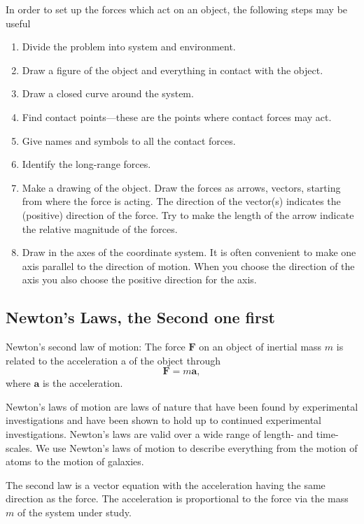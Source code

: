 \documentclass[%
oneside,                 %
final,                   %
10pt]{article}
\begin{document}
In order to set up the forces which act on an object, the following steps may be useful
\begin{enumerate}
\item Divide the problem into system and environment.

\item Draw a figure of the object and everything in contact with the object.

\item Draw a closed curve around the system.

\item Find contact points—these are the points where contact forces may act.

\item Give names and symbols to all the contact forces.

\item Identify the long-range forces.

\item Make a drawing of the object. Draw the forces as arrows, vectors, starting from where the force is acting. The direction of the vector(s) indicates the (positive) direction of the force. Try to make the length of the arrow indicate the relative magnitude of the forces.

\item Draw in the axes of the coordinate system. It is often convenient to make one axis parallel to the direction of motion. When you choose the direction of the axis you also choose the positive direction for the axis.
\end{enumerate}

\noindent
\subsection{Newton's Laws, the Second one first}

Newton’s second law of motion: The force $\bm{F}$ on an object of inertial mass $m$
is related to the acceleration a of the object through
\[
\bm{F} = m\bm{a},
\]
where $\bm{a}$ is the acceleration.

Newton’s laws of motion are laws of nature that have been found by experimental
investigations and have been shown to hold up to continued experimental investigations.
Newton’s laws are valid over a wide range of length- and time-scales. We
use Newton’s laws of motion to describe everything from the motion of atoms to the
motion of galaxies.

The second law is a vector equation with the acceleration having the same
direction as the force. The acceleration is proportional to the force via the mass $m$ of the system under study.
\end{document}
